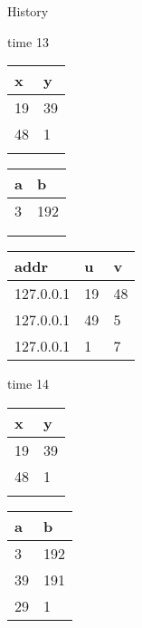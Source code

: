 \begin{block}{History}
  \begin{center}
    \ttfamily
    \begin{minipage}{0.3\textwidth}
      time 13

      \vspace{0.5cm}

      \begin{tabularx}{0.47\textwidth}{|X|X|}
        \hline\rowcolor{red!20}
        \textbf{x} & \textbf{y} \\\hline
        19         & 39 \\\hline
        48         & 1 \\\hline
                   &   \\\hline
      \end{tabularx}
      \hfill
      \begin{tabularx}{0.47\textwidth}{|X|X|}
        \hline\rowcolor{green!20}
        \textbf{a} & \textbf{b} \\\hline
        3          & 192 \\\hline
                   & \\\hline
                   &  \\\hline
      \end{tabularx}

      \vspace{0.5cm}

      \begin{tabularx}{\textwidth}{|X|l|l|}
        \hline\rowcolor{blue!20}
        \textbf{addr}  & \textbf{u} & \textbf{v} \\\hline
        127.0.0.1 & 19         & 48 \\\hline
        127.0.0.1 & 49         & 5 \\\hline
        127.0.0.1 & 1          & 7 \\\hline
      \end{tabularx}
    \end{minipage}
    \hfill
    \begin{minipage}{0.3\textwidth}
      time 14

      \vspace{0.5cm}

      \begin{tabularx}{0.47\textwidth}{|X|X|}
        \hline\rowcolor{red!20}
        \textbf{x} & \textbf{y} \\\hline
        19         & 39 \\\hline
        48         & 1 \\\hline
                   &   \\\hline
      \end{tabularx}
      \hfill
      \begin{tabularx}{0.47\textwidth}{|X|X|}
        \hline\rowcolor{green!20}
        \textbf{a} & \textbf{b} \\\hline
        3          & 192 \\\hline
        39         & 191 \\\hline
        29         & 1 \\\hline
      \end{tabularx}


\end{minipage}
\end{center}
\end{block}
